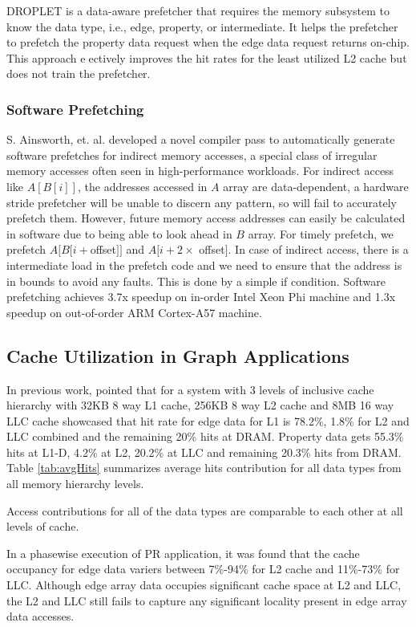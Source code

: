 \documentclass[a4paper,12pt, final]{report}
\begin{document}
DROPLET\cite{droplet} is a data-aware prefetcher that requires the memory subsystem to know
the data type, i.e., edge, property, or intermediate. It helps the prefetcher to prefetch
the property data request when the edge data request returns on-chip. This approach
eectively improves the hit rates for the least utilized L2 cache but does not train the
prefetcher.

\subsubsection{Software Prefetching}
S. Ainsworth, et. al. \cite{softPrefetch} developed a novel compiler pass to automatically
generate software prefetches for indirect memory
accesses, a special class of irregular memory accesses often
seen in high-performance workloads. For indirect access like $A[B[i]]$, the addresses accessed
in $A$ array are data-dependent, a hardware
stride prefetcher will be unable to discern any pattern, so
will fail to accurately prefetch them. However, future memory
access addresses can easily be calculated in software due
to being able to look ahead in $B$ array.
For timely prefetch, we prefetch $A[B[i + $offset$]]$ and $A[i+2\times$ offset$]$. In case of indirect access, there is a intermediate load in the prefetch code and we need to ensure that the address is in bounds to avoid any faults. This is done by a simple if condition. Software prefetching achieves 3.7x speedup on in-order Intel Xeon Phi machine and 1.3x speedup on out-of-order ARM Cortex-A57 machine. 


\subsection{Cache Utilization in Graph Applications}
In previous work, \cite{grace} pointed that for a system with 3 levels of inclusive cache hierarchy with 32KB 8 way L1 cache, 256KB 8 way L2 cache and 8MB 16 way LLC cache showcased that hit rate for edge data for L1 is 78.2\%, 1.8\% for L2 and LLC combined and the remaining 20\% hits at DRAM. Property data gets 55.3\% hits at L1-D, 4.2\% at L2, 20.2\% at LLC and
remaining 20.3\% hits from DRAM. Table \ref{tab:avgHits} summarizes average hits contribution for all data types from all memory hierarchy levels. 

Access contributions for all of the data types are comparable to each other at all levels of cache.

In a phasewise execution of PR application, it was found that the cache occupancy for edge data variers between 7\%-94\% for L2 cache and 11\%-73\% for LLC. Although edge array
data occupies significant cache space at L2 and LLC, the L2 and LLC still fails to capture
any significant locality present in edge array data accesses.
\end{document}
